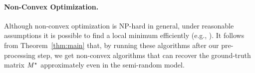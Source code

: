 \paragraph{Non-Convex Optimization.} Although non-convex optimization is NP-hard in general, under reasonable assumptions it is possible to find a local minimum efficiently (e.g., \citep{ge2015escaping,agarwal2016finding,jin2017escape}). It follows from Theorem~\ref{thm:main} that, by running these algorithms after our pre-processing step, we get non-convex algorithms that can recover the ground-truth matrix $M^\star$ approximately even in the semi-random model.
